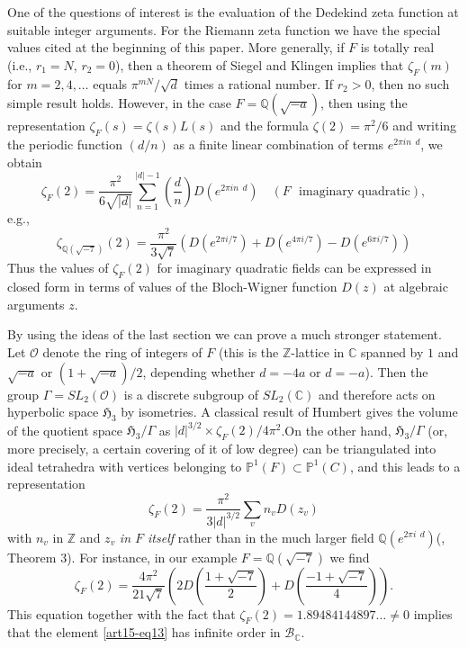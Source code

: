 One of the questions of interest is the evaluation of the Dedekind zeta function at suitable integer arguments. For the Riemann zeta function we have the special values cited at the beginning of this paper. More generally, if $F$ is totally real (i.e., $r_{1}=N$, $r_{2}=0$), then a theorem of Siegel and Klingen implies that $\zeta_{F}(m)$ for $m=2,4,\ldots$ equals $\pi^{mN}/\sqrt{d}$ times a rational number. If $r_{2}>0$, then no such simple result holds. However, in the case $F=\mathbb{Q}(\sqrt{-a})$, then using the representation $\zeta_{F}(s)=\zeta(s)L(s)$ and the formula $\zeta(2)=\pi^{2}/6$ and writing the periodic function $(d/n)$ as a finite linear combination of terms $e^{2\pi in \ \ d}$, we obtain
$$
\zeta_{F}(2)=\frac{\pi^{2}}{6\sqrt{|d|}}\sum\limits^{|d|-1}_{n=1}\left(\dfrac{d}{n}\right)D(e^{2\pi in \ \ d})\quad (F\text{~ imaginary quadratic}),
$$
e.g.,
$$
\zeta_{\mathbb{Q}(\sqrt{-7})}(2)=\frac{\pi^{2}}{3\sqrt{7}}\left(D(e^{2\pi i/7})+D(e^{4\pi i/7})-D(e^{6\pi i/7})\right)
$$
Thus the values of $\zeta_{F}(2)$ for imaginary quadratic fields can be expressed in closed form in terms of values of the Bloch-Wigner function $D(z)$ at algebraic arguments $z$.

By using the ideas of the last section we can prove a much stronger statement. Let $\mathscr{O}$ denote the ring of integers of $F$ (this is the $\mathbb{Z}$-lattice in $\mathbb{C}$ spanned by $1$ and $\sqrt{-a}$ or $(1+\sqrt{-a})/2$, depending whether $d=-4a$ or $d=-a$). Then the group $\Gamma=SL_{2}(\mathscr{O})$ is a discrete subgroup of $SL_{2}(\mathbb{C})$ and therefore acts on hyperbolic space $\mathfrak{H}_{3}$ by isometries. A classical result of Humbert gives the volume of the quotient space $\mathfrak{H}_{3}/\Gamma$ as $|d|^{3/2}\times \zeta_{F}(2)/4\pi^{2}$.\pageoriginale On the other hand, $\mathfrak{H}_{3}/\Gamma$ (or, more precisely, a certain covering of it of low degree) can be triangulated into ideal tetrahedra with vertices belonging to $\mathbb{P}^{1}(F)\subset \mathbb{P}^{1}(C)$, and this leads to a representation
$$
\zeta_{F}(2)=\frac{\pi^{2}}{3|d|^{3/2}}\sum\limits_{v}n_{v}D(z_{v})
$$
with $n_{v}$ in $\mathbb{Z}$ and $z_{v}$ {\em in $F$ itself} rather than in the much larger field $\mathbb{Q}(e^{2\pi i \ \ d})$(\cite{art15-key8}, Theorem 3). For instance, in our example $F=\mathbb{Q}(\sqrt{-7})$ we find
$$
\zeta_{F}(2)=\frac{4\pi^{2}}{21\sqrt{7}}\left(2D\left(\frac{1+\sqrt{-7}}{2}\right)+D\left(\frac{-1+\sqrt{-7}}{4}\right)\right).
$$
This equation together with the fact that $\zeta_{F}(2)=1.89484144897\ldots\neq 0$ implies that the element \eqref{art15-eq13} has infinite order in $\mathscr{B}_{\mathbb{C}}$.

